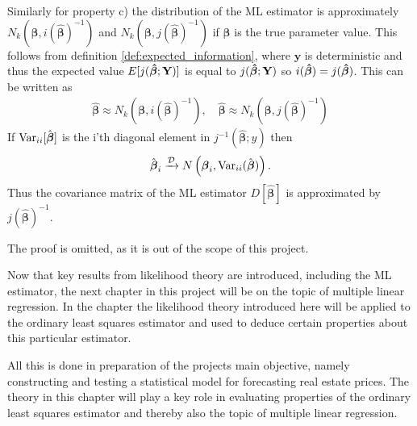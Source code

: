 Similarly for property c) the distribution of the ML estimator is approximately $N_k(\boldsymbol{\beta}, i(\hat{\boldsymbol{\beta}})^{-1})$ and $N_k(\boldsymbol{\beta}, j(\hat{\boldsymbol{\beta}})^{-1})$ if $\boldsymbol{\beta}$ is the true parameter value. This follows from definition \ref{def:expected_information}, where $\textbf{y}$ is deterministic and thus the expected value $E[j(\operatorname{\boldsymbol{\hat{\beta}}} ; \textbf{Y})]$ is equal to $j(\operatorname{\boldsymbol{\hat{\beta}}}; \textbf{Y})$ so $i(\operatorname{\boldsymbol{\hat{\beta}}}) = j(\operatorname{\boldsymbol{\hat{\beta}}})$. This can be written as
\begin{align*}
    \hat{\boldsymbol{\beta}} \approx N_k(\boldsymbol{\beta}, i(\hat{\boldsymbol{\beta}})^{-1}), \quad \hat{\boldsymbol{\beta}} \approx N_k(\boldsymbol{\beta}, j(\hat{\boldsymbol{\beta}})^{-1})
\end{align*}
If $\operatorname{\text{Var}}_{ii}[\hat{\boldsymbol{\beta}}]$ is the i'th diagonal element in $j^{-1}(\hat{\boldsymbol{\beta}};y)$ then
\begin{align*}
    \hat{\boldsymbol{\beta}}_i \xrightarrow{\mathcal{D}} N\left( \boldsymbol{\beta}_i, \operatorname{\text{Var}}_{ii}(\hat{\boldsymbol{\beta}}) \right).
\end{align*}
Thus the covariance matrix of the ML estimator $D[\hat{\boldsymbol{\beta}}]$ is approximated by $j(\hat{\boldsymbol{\beta}})^{-1}$.

The proof is omitted, as it is out of the scope of this project. 

Now that key results from likelihood theory are introduced, including the ML estimator, the next chapter in this project will be on the topic of multiple linear regression.
In the chapter the likelihood theory introduced here will be applied to the ordinary least squares estimator and used to deduce certain properties about this particular estimator.

All this is done in preparation of the projects main objective, namely constructing and testing a statistical model for forecasting real estate prices.
The theory in this chapter will play a key role in evaluating properties of the ordinary least squares estimator and thereby also the topic of multiple linear regression.